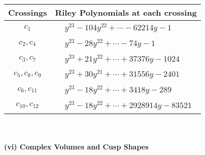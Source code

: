 \documentclass[1p]{elsarticle_modified}
\theoremstyle{definition}
\begin{document}
\begin{tabular}{m{50pt}|m{274pt}}
Crossings & \hspace{64pt}Riley Polynomials at each crossing \\
\hline $$\begin{aligned}c_{1}\end{aligned}$$&$\begin{aligned}
&y^{23}-104 y^{22}+\cdots-62214 y-1
\end{aligned}$\\
\hline $$\begin{aligned}c_{2},c_{4}\end{aligned}$$&$\begin{aligned}
&y^{23}-28 y^{22}+\cdots-74 y-1
\end{aligned}$\\
\hline $$\begin{aligned}c_{3},c_{7}\end{aligned}$$&$\begin{aligned}
&y^{23}+21 y^{22}+\cdots+37376 y-1024
\end{aligned}$\\
\hline $$\begin{aligned}c_{5},c_{8},c_{9}\end{aligned}$$&$\begin{aligned}
&y^{23}+30 y^{21}+\cdots+31556 y-2401
\end{aligned}$\\
\hline $$\begin{aligned}c_{6},c_{11}\end{aligned}$$&$\begin{aligned}
&y^{23}-18 y^{22}+\cdots+3418 y-289
\end{aligned}$\\
\hline $$\begin{aligned}c_{10},c_{12}\end{aligned}$$&$\begin{aligned}
&y^{23}-18 y^{22}+\cdots+2928914 y-83521
\end{aligned}$\\
\hline
\end{tabular}\\~\\
\newpage\flushleft \textbf{(vi) Complex Volumes and Cusp Shapes}
\end{document}
